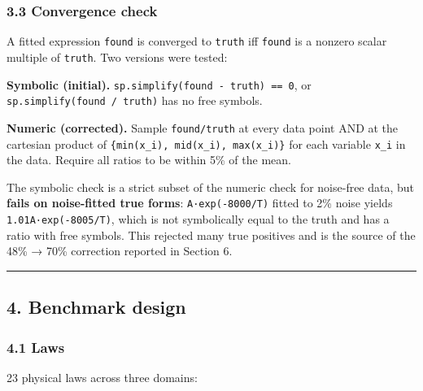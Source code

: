 \documentclass[
]{article}
\begin{document}
\subsubsection{3.3 Convergence check}\label{convergence-check}

A fitted expression \texttt{found} is converged to \texttt{truth} iff
\texttt{found} is a nonzero scalar multiple of \texttt{truth}. Two
versions were tested:

\textbf{Symbolic (initial).}
\texttt{sp.simplify(found\ -\ truth)\ ==\ 0}, or
\texttt{sp.simplify(found\ /\ truth)} has no free symbols.

\textbf{Numeric (corrected).} Sample \texttt{found/truth} at every data
point AND at the cartesian product of
\texttt{\{min(x\_i),\ mid(x\_i),\ max(x\_i)\}} for each variable
\texttt{x\_i} in the data. Require all ratios to be within 5\% of the
mean.

The symbolic check is a strict subset of the numeric check for
noise-free data, but \textbf{fails on noise-fitted true forms}:
\texttt{A·exp(-8000/T)} fitted to 2\% noise yields
\texttt{1.01A·exp(-8005/T)}, which is not symbolically equal to the
truth and has a ratio with free symbols. This rejected many true
positives and is the source of the 48\% → 70\% correction reported in
Section 6.

\begin{center}\rule{0.5\linewidth}{0.5pt}\end{center}

\subsection{4. Benchmark design}\label{benchmark-design}

\subsubsection{4.1 Laws}\label{laws}

23 physical laws across three domains:
\end{document}
